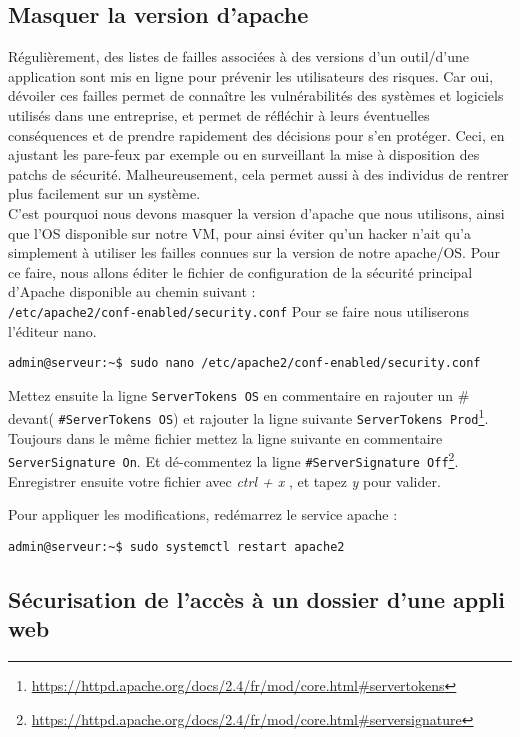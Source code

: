 \subsection{Masquer la version d'apache}
Régulièrement, des listes de failles associées à des versions d'un outil/d'une application sont mis en ligne pour prévenir les utilisateurs des risques. Car oui, dévoiler ces failles permet de connaître les vulnérabilités des systèmes et logiciels utilisés dans une entreprise, et permet de réfléchir à leurs éventuelles conséquences et de prendre rapidement des décisions pour s’en protéger. Ceci, en ajustant les pare-feux par exemple ou en surveillant la mise à disposition des patchs de sécurité. Malheureusement, cela permet aussi à des individus de rentrer plus facilement sur un système. \\
C'est pourquoi nous devons masquer la version d'apache que nous utilisons, ainsi que l'OS disponible sur notre VM, pour ainsi éviter qu'un hacker n'ait qu'a simplement à utiliser les failles connues sur la version de notre apache/OS. Pour ce faire, nous allons  éditer le fichier de configuration de la sécurité principal d’Apache disponible au chemin suivant : \\ \texttt{/etc/apache2/conf-enabled/security.conf}
Pour se faire nous utiliserons l'éditeur nano. 
\begin{verbatim}
admin@serveur:~$ sudo nano /etc/apache2/conf-enabled/security.conf
\end{verbatim}
Mettez ensuite la ligne \texttt{ServerTokens OS} en commentaire en rajouter un \# devant( \texttt{\#ServerTokens OS}) et rajouter la ligne suivante \texttt{ServerTokens Prod}\footnote{\url{https://httpd.apache.org/docs/2.4/fr/mod/core.html\#servertokens}}. \\
Toujours dans le même fichier mettez la ligne suivante en commentaire \texttt{ServerSignature On}. Et dé-commentez la ligne \texttt{\#ServerSignature Off}\footnote{\url{https://httpd.apache.org/docs/2.4/fr/mod/core.html\#serversignature}}. \\
Enregistrer ensuite votre fichier avec \emph{ctrl + x} , et tapez \emph{y} pour valider.

Pour appliquer les modifications, redémarrez le service apache :
\begin{verbatim}
admin@serveur:~$ sudo systemctl restart apache2
\end{verbatim}




\subsection{Sécurisation de l'accès à un dossier d'une appli web}
